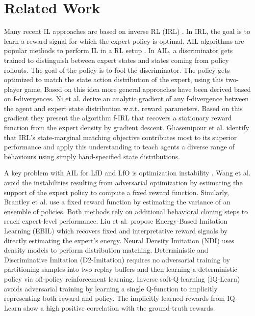 \documentclass{article}
\begin{document}
\section{Related Work}

Many recent IL approaches are based on inverse RL (IRL) \cite{Ng2000AlgorithmsFI}. In IRL, the goal is to learn a reward signal for which the expert policy is optimal. AIL algorithms are popular methods to perform IL in a RL setup \cite{GAIL,fu2017learning,Kostrikov2020Imitation}. In AIL, a discriminator gets trained to distinguish between expert states and states coming from policy rollouts. The goal of the policy is to fool the discriminator. The policy gets optimized to match the state action distribution of the expert, using this two-player game. Based on this idea more general approaches have been derived based on f-divergences. Ni et al. derive an analytic gradient of any f-divergence between the agent and expert state distribution w.r.t. reward parameters. Based on this gradient they present the algorithm f-IRL that recovers a stationary reward function from the expert density by gradient descent. Ghasemipour et al. identify that IRL’s state-marginal matching objective contributes most to its superior performance and apply this understanding to teach agents a diverse range of behaviours using simply hand-specified state distributions.

A key problem with AIL for LfD and LfO is optimization instability \cite{miyato2018spectral}. Wang et al. avoid the instabilities resulting from adversarial optimization by estimating the support of the expert policy to compute a fixed reward function. Similarly, Brantley et al. use a fixed reward function by estimating the variance of an ensemble of policies. Both methods rely on additional behavioral cloning steps to reach expert-level performance. Liu et  al. propose Energy-Based Imitation Learning (EBIL) which recovers fixed and interpretative reward signals by directly estimating the expert’s energy. Neural Density Imitation (NDI) \cite{kim2021imitation} uses density models to perform distribution matching. Deterministic and Discriminative Imitation (D2-Imitation) \cite{sun2021deterministic} requires no adversarial training by partitioning samples into two replay buffers and then learning a deterministic policy via off-policy reinforcement learning. Inverse soft-Q learning (IQ-Learn) \cite{garg2021iqlearn} avoids adversarial training by learning a single Q-function to implicitly representing both reward and policy. The implicitly learned rewards from IQ-Learn show a high positive correlation with the ground-truth rewards.  
\end{document}
